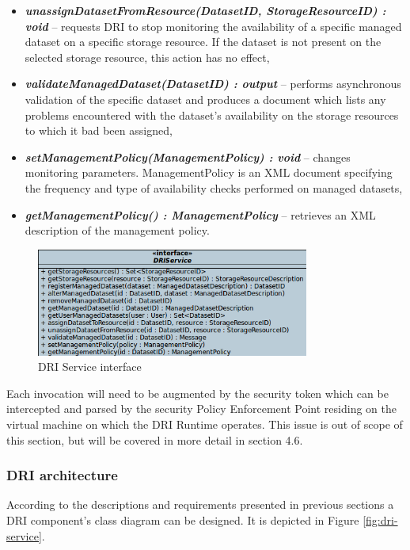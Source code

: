 \documentclass[a4paper,12pt,titlepage]{article}
\begin{document}
\begin{itemize}
\item \textbf{\textit{unassignDatasetFromResource(DatasetID, StorageResourceID) : void}} -- requests DRI to stop monitoring the availability of a specific managed dataset on a specific storage resource. If the dataset is not present on the selected storage resource, this action has no effect,
\item \textbf{\textit{validateManagedDataset(DatasetID) : output}} -- performs asynchronous validation of the specific dataset and produces a document which lists any problems encountered with the dataset's availability on the storage resources to which it bad been assigned,
\item \textbf{\textit{setManagementPolicy(ManagementPolicy) : void}} -- changes monitoring parameters. ManagementPolicy is an XML document specifying the frequency and type of availability checks performed on managed datasets,
\item \textbf{\textit{getManagementPolicy() : ManagementPolicy}} -- retrieves an XML description of the management policy.
\end{itemize}

\begin{figure}[h!]
	\centering
	\includegraphics[width=0.8\textwidth]{img/dri-interface.png}
	\caption{DRI Service interface}
	\label{fig:dri-interface}
\end{figure}


\noindent
Each invocation will need to be augmented by the security token which can be intercepted and parsed by the security Policy Enforcement Point residing on the virtual machine on which the DRI Runtime operates. This issue is out of scope of this section, but will be covered in more detail in section 4.6.\\


\subsubsection{DRI architecture}
According to the descriptions and requirements presented in previous sections a DRI component's class diagram can be designed. It is depicted in Figure \ref{fig:dri-service}.\\
\end{document}
